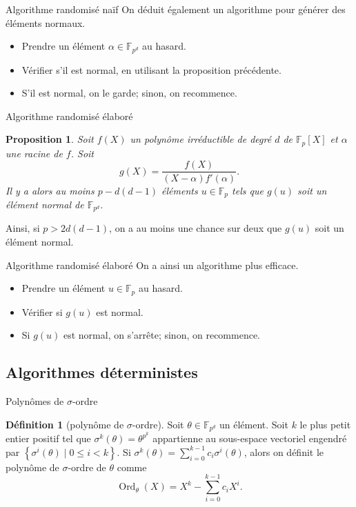 \documentclass[xcolor=x11names,compress]{beamer}
\theoremstyle{break}
\newtheorem{prop}[thm]{Proposition}
\theoremstyle{sc}
\theoremstyle{definition}
\newtheorem{defi}[thm]{Définition}
\theoremstyle{remark}
\DeclareMathOperator{\Ord}{Ord}
\begin{document}
\begin{frame}{Algorithme randomisé naïf}
  On déduit également un algorithme pour générer des éléments normaux.
  \begin{itemize}
    \item<2-> Prendre un élément $\alpha\in\mathbb{F}_{p^d}$ au hasard.
    \item<3-> Vérifier s'il est normal, en utilisant la proposition précédente. 
    \item<4-> S'il est normal, on le garde; sinon, on recommence.
  \end{itemize}

\end{frame}

\begin{frame}{Algorithme randomisé élaboré}
  \begin{prop}
    Soit $f(X)$ un polynôme irréductible de degré $d$ de $\mathbb{F}_p[X]$ et
    $\alpha$ une racine de $f$. Soit 
    \[
      g(X) = \frac{f(X)}{(X-\alpha)f'(\alpha)}.
    \]
    Il y a alors au moins $p-d(d-1)$ éléments $u\in\mathbb{F}_p$ tels que $g(u)$
    soit un élément normal de $\mathbb{F}_{p^d}$.
  \end{prop}
  Ainsi, si $p>2d(d-1)$, on a au moins une chance sur deux que $g(u)$ soit un
  élément normal.
\end{frame}

\begin{frame}{Algorithme randomisé élaboré}
  On a ainsi un algorithme plus efficace.
  \begin{itemize}
    \item<2-> Prendre un élément $u\in\mathbb{F}_{p}$ au hasard.
    \item<3-> Vérifier si $g(u)$ est normal. 
    \item<4-> Si $g(u)$ est normal, on s'arrête; sinon, on recommence.
  \end{itemize}

\end{frame}

\subsection{Algorithmes déterministes}
\begin{frame}{Polynômes de $\sigma$-ordre}
  \begin{defi}[polynôme de $\sigma$-ordre]
      Soit $\theta\in\mathbb{F}_{p^d}$ un élément. Soit $k$ le plus petit entier
      positif tel que $\sigma^k(\theta)=\theta^{p^k}$ appartienne au sous-espace
      vectoriel engendré par $\left\{ \sigma^i(\theta)\;|\;0\leq i<k \right\}$.
      Si $\sigma^k(\theta)=\sum_{i=0}^{k-1}c_i\sigma^i(\theta)$, alors on
      définit le polynôme de $\sigma$-ordre de $\theta$ comme
      \[
        \Ord_{\theta}(X)=X^k-\sum_{i=0}^{k-1}c_iX^i.
      \]
  \end{defi}
\end{frame}
\end{document}
